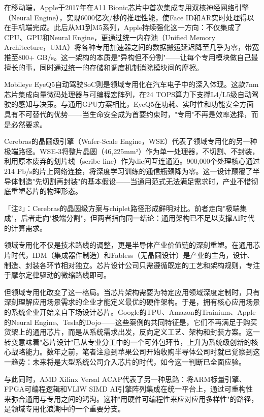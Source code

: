 \documentclass[11pt,a4paper]{article}
\begin{document}
在移动端，Apple于2017年在A11 Bionic芯片中首次集成专用双核神经网络引擎（Neural Engine），实现6000亿次/秒的推理性能，使Face ID和AR实时处理得以在手机端完成。此后从M1到M5系列，Apple持续强化这一方向：不仅集成了CPU、GPU和Neural Engine，更通过统一内存池（Unified Memory Architecture，UMA）将各种专用加速器之间的数据搬运延迟降至几乎为零，带宽推至800+ GB/s。这一架构的本质是"异构但不分割"——让每个专用模块做自己最擅长的事，同时通过统一的存储和调度机制消除模块间的摩擦。

Mobileye EyeQ5自动驾驶SoC则是领域专用化在汽车电子中的深入体现。这款7nm芯片集成向量微码处理器与可编程宏阵列，在24 TOPS算力下支撑L4/L5级自动驾驶的感知与决策。与通用GPU方案相比，EyeQ5在功耗、实时性和功能安全方面具有不可替代的优势——当生命安全成为首要约束时，"专用"不再是效率选择，而是必然要求。

Cerebras的晶圆级引擎（Wafer-Scale Engine，WSE）代表了领域专用化的另一种极端路径。WSE-3将整片晶圆（46,225mm²）作为单一处理器，不切割、不封装，利用原本废弃的划片线（scribe line）作为die间互连通道。900,000个处理核心通过214 Pb/s的片上网络连接，将深度学习训练的通信瓶颈降为零。这一设计颠覆了半导体制造"先切割再封装"的基本假设——当通用范式无法满足需求时，产业不惜彻底重塑芯片的物理形态。

「注2」：Cerebras的晶圆级方案与chiplet路径形成鲜明对比。前者走向"极端集成"，后者走向"极端分割"，但两者指向同一结论：通用架构已不足以支撑AI时代的计算需求。

领域专用化不仅是技术路线的调整，更是半导体产业价值链的深刻重塑。在通用芯片时代，IDM（集成器件制造）和Fabless（无晶圆设计）是产业的主角，设计、制造、封装各环节相对独立。芯片设计公司只需遵循既定的工艺和架构规则，专注于摩尔定律驱动的微缩路线即可。

但领域专用化改变了这一格局。当芯片架构需要为特定应用领域深度定制时，只有深刻理解应用场景需求的企业才能定义最优的硬件架构。于是，拥有核心应用场景的系统企业开始亲自下场设计芯片。Google的TPU、Amazon的Trainium、Apple的Neural Engine、Tesla的Dojo——这些案例的共同特征是，它们不再满足于购买货架上的通用芯片，而是从系统需求出发，反向定义工艺、架构和封装方案。这一转变意味着"芯片设计"已从专业分工中的一个可外包环节，上升为系统级创新的核心战略能力。数年之前，笔者注意到苹果公司开始收购半导体公司时就已觉察到这一趋势：未来将是大型系统公司介入芯片的时代，如今这一判断已全面应验。

与此同时，AMD Xilinx Versal ACAP代表了另一种思路：将ARM标量引擎、FPGA可编程逻辑和VLIW SIMD AI引擎阵列集成在统一平台上，通过可重构性来弥合通用与专用之间的鸿沟。这种"用硬件可编程性来应对应用多样性"的路径，是领域专用化浪潮中的一个重要分支。
\end{document}
